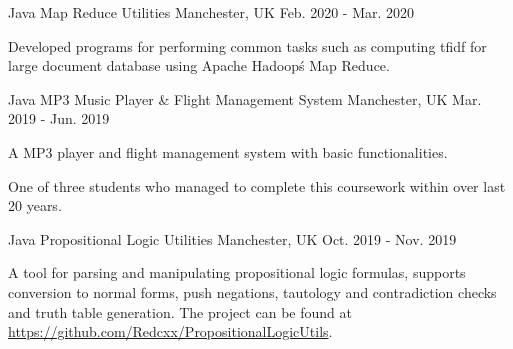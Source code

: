 \begin{cventries}
  \cventry
    {Java} %
    {Map Reduce Utilities} %
    {Manchester, UK} %
    {Feb. 2020 - Mar. 2020} %
    {
      \begin{cvitems} %
        \item {Developed programs for performing common tasks such as computing tfidf for large document database using Apache Hadoop\'s Map Reduce.}
      \end{cvitems}
    }
  

\cventry
  {Java} %
  {MP3 Music Player \& Flight Management System} %
  {Manchester, UK} %
  {Mar. 2019 - Jun. 2019} %
  {
    \begin{cvitems} %
      \item {A MP3 player and flight management system with basic functionalities.}
      \item {One of three students who managed to complete this coursework within  over last 20 years.}
    \end{cvitems}
  }

  \cventry
    {Java} %
    {Propositional Logic Utilities} %
    {Manchester, UK} %
    {Oct. 2019 - Nov. 2019} %
    {
      \begin{cvitems} %
        \item {A tool for parsing and manipulating propositional logic formulas, supports conversion to normal forms, push negations, tautology and contradiction checks and truth table generation. The project can be found at \href{https://github.com/Redcxx/PropositionalLogicUtils}{https://github.com/Redcxx/PropositionalLogicUtils}.}
      \end{cvitems}
    }


\end{cventries}

